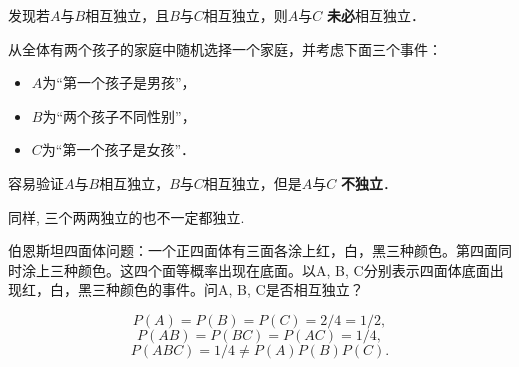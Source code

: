 发现若$A$与$B$相互独立，且$B$与$C$相互独立，则$A$与$C$ \textbf{未必}相互独立．
\begin{example}
    从全体有两个孩子的家庭中随机选择一个家庭，并考虑下面三个事件：
    \begin{itemize}
        \item $A$为“第一个孩子是男孩”，
        \item $B$为“两个孩子不同性别”，
        \item $C$为“第一个孩子是女孩”．
    \end{itemize}
    容易验证$A$与$B$相互独立，$B$与$C$相互独立，但是$A$与$C$ \textbf{不独立}．

    同样, 三个两两独立的也不一定都独立. 

    伯恩斯坦四面体问题：一个正四面体有三面各涂上红，白，黑三种颜色。第四面同时涂上三种颜色。这四个面等概率出现在底面。以A, B, C分别表示四面体底面出现红，白，黑三种颜色的事件。问A, B, C是否相互独立？

    $$
            P(A)=P(B)=P(C)=2/4=1/2,
        $$
        $$
            P(AB)=P(BC)=P(AC)=1/4,
        $$
        $$
            P(ABC)=1/4\neq P(A)P(B)P(C).
        $$
\end{example}




